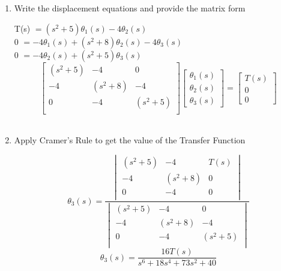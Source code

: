 ﻿\documentclass[11pt]{article}
\begin{document}
\begin{enumerate}[label=(\alph*),itemindent=*, leftmargin=*, nolistsep]
\begin{center}
            \vspace{15pt}
    
            $\sum T_0 = 0 \quad\text{(clockwise, +)}$ \\ \vspace{10pt}
            $0 = 4\theta_2(s) - (s^2 + 5)\theta_3(s)$ \\ \vspace{10pt}
            $0 = -4\theta_2(s) + (s^2 + 5)\theta_3(s)$ 

    \end{center}
\vspace{15pt}
    \item Write the displacement equations and provide the matrix form
\begin{center}
    T(s) $= (s^2 + 5)\theta_1(s) - 4\theta_2(s)$\\
    0 $= -4\theta_1(s) + (s^2 + 8)\theta_2(s) - 4\theta_3(s)$\\
    0 $= -4\theta_2(s) + (s^2 + 5)\theta_3(s)$\\
    \[
        \begin{bmatrix}
        (s^2 + 5) & -4 & 0\\
        -4 & (s^2 + 8) & -4\\
        0 & -4 & (s^2 + 5)\\
        \end{bmatrix}
        \begin{bmatrix}
        \theta_1(s) \\
        \theta_2(s) \\
        \theta_3(s)
        \end{bmatrix}
        =
        \begin{bmatrix}
        T(s)\\
        0\\
        0
        \end{bmatrix}
    \]\\
\end{center}
\vspace{15pt}
    \item Apply Cramer's Rule to get the value of the Transfer Function
\begin{center}
    \[
        \theta_3(s) = 
            \frac{\begin{vmatrix}
                (s^2 + 5) & -4 & T(s)\\
                -4 & (s^2 + 8) & 0\\
                0 & -4 & 0\\
            \end{vmatrix}
        }{\begin{vmatrix}
                (s^2 + 5) & -4 & 0\\
                -4 & (s^2 + 8) & -4\\
                0 & -4 & (s^2 + 5)\\
            \end{vmatrix}
        }
    \]
    \[
    \theta_3(s) = \frac{16 T(s)}{s^6 + 18s^4 + 73s^2 + 40}
    \] 


\end{center}
\end{enumerate}
\end{document}
